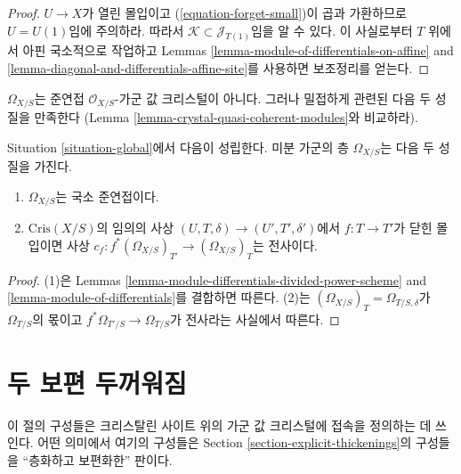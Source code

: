 \begin{proof}
$U \to X$가 열린 몰입이고 (\ref{equation-forget-small})이 곱과
가환하므로 $U = U(1)$임에 주의하라. 따라서
$\mathcal{K} \subset \mathcal{J}_{T(1)}$임을 알 수 있다.
이 사실로부터 $T$ 위에서 아핀 국소적으로 작업하고 Lemmas
\ref{lemma-module-of-differentials-on-affine} and
\ref{lemma-diagonal-and-differentials-affine-site}를 사용하면
보조정리를 얻는다.
\end{proof}

\noindent
$\Omega_{X/S}$는 준연접 $\mathcal{O}_{X/S}$-가군 값 크리스털이
아니다. 그러나 밀접하게 관련된 다음 두 성질을 만족한다
(Lemma \ref{lemma-crystal-quasi-coherent-modules}와 비교하라).

\begin{lemma}
\label{lemma-omega-locally-quasi-coherent}
Situation \ref{situation-global}에서 다음이 성립한다.
미분 가군의 층 $\Omega_{X/S}$는 다음 두 성질을 가진다.
\begin{enumerate}
\item $\Omega_{X/S}$는 국소 준연접이다.
\item $\text{Cris}(X/S)$의 임의의 사상
$(U, T, \delta) \to (U', T', \delta')$에서
$f : T \to T'$가 닫힌 몰입이면 사상
$c_f : f^*(\Omega_{X/S})_{T'} \to (\Omega_{X/S})_T$는 전사이다.
\end{enumerate}
\end{lemma}

\begin{proof}
(1)은 Lemmas \ref{lemma-module-differentials-divided-power-scheme} and
\ref{lemma-module-of-differentials}를 결합하면 따른다.
(2)는 $(\Omega_{X/S})_T = \Omega_{T/S, \delta}$가
$\Omega_{T/S}$의 몫이고
$f^*\Omega_{T'/S} \to \Omega_{T/S}$가 전사라는 사실에서 따른다.
\end{proof}







\section{두 보편 두꺼워짐}
\label{section-universal-thickenings}

\noindent
이 절의 구성들은 크리스탈린 사이트 위의 가군 값 크리스털에
접속을 정의하는 데 쓰인다. 어떤 의미에서 여기의 구성들은
Section \ref{section-explicit-thickenings}의 구성들을
``층화하고 보편화한'' 판이다.

